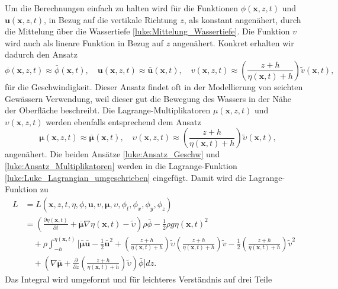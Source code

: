Um die Berechnungen einfach zu halten wird für die Funktionen $\phi (\bm{x},z,t)$ und $\bm{u} (\bm{x},z,t)$, in Bezug auf die vertikale Richtung $z$, als konstant angenähert, durch die Mittelung über die Wassertiefe \eqref{luke:Mittelung_Wassertiefe}.
Die Funktion $v$ wird auch als lineare Funktion in Bezug auf $z$ angenähert. 
Konkret erhalten wir dadurch den Ansatz
\begin{equation}
	\phi(\bm{x},z,t) \approx \bar{\phi}(\bm{x}, t), \quad \bm{u}(\bm{x},z,t) \approx \bar{\bm{u}}(\bm{x}, t), \quad v(\bm{x},z,t) \approx \left(\frac{z + h}{\eta(\bm{x}, t) + h}\right) \tilde{v}(\bm{x}, t),
	\label{luke:Ansatz_Geschw}
\end{equation}
für die Geschwindigkeit.
Dieser Ansatz findet oft in der Modellierung von seichten Gewässern Verwendung, weil dieser gut die Bewegung des Wassers in der Nähe der Oberfläche beschreibt.
Die Lagrange-Multiplikatoren $\mu(\bm{x},z,t)$ und $\upsilon(\bm{x},z,t)$ werden ebenfalls entsprechend dem Ansatz
\begin{equation}
	\quad \bm{\mu}(\bm{x},z,t) \approx \bar{\bm{\mu}}(\bm{x}, t), \quad \upsilon(\bm{x},z,t) \approx \left(\frac{z + h}{\eta(\bm{x}, t) + h}\right)\tilde{\upsilon}(\bm{x}, t),
	\label{luke:Ansatz_Multiplikatoren}
\end{equation}
angenähert.
Die beiden Ansätze \eqref{luke:Ansatz_Geschw} und \eqref{luke:Ansatz_Multiplikatoren} werden in die Lagrange-Funktion \eqref{luke:Luke_Lagrangian_umgeschrieben} eingefügt.
Damit wird die Lagrange-Funktion zu
\begin{align*}
	L&=
	L(\bm{x},z,t,\eta,\phi,\bm{u}, v, \bm{\mu},\upsilon,\phi_t,\phi_x,\phi_y,\phi_z)
	\\
	&=
	\left(\frac{\partial \eta(\bm{x}, t)}{\partial t}
	+
	\bar{\bm{\mu}}  \nabla \eta(\bm{x}, t)
	-
	\widetilde{\upsilon}\right)\rho \bar{\phi}
	-
	\frac{1}{2} \rho g \eta(\bm{x}, t)^2
	\\
	&\quad+
	\rho\int_{-h}^{\eta(\bm{x}, t)} \Bigg[ \bar{\bm{\mu}}  \bar{\bm{u}} - \frac{1}{2} \bar{\bm{u}}^2 +\left(\frac{z + h}{\eta(\bm{x}, t) + h}\right)\tilde{\upsilon} \left(\frac{z + h}{\eta(\bm{x}, t) + h}\right)\tilde{v} - \frac{1}{2} \left(\frac{z + h}{\eta(\bm{x}, t) + h}\right)\tilde{v}^2 
	\\
	&\quad+\left(\nabla \bar{\bm{\mu}} + \frac{\partial}{\partial z} \left(\frac{z + h}{\eta(\bm{x}, t) + h}\right)\tilde{\upsilon}\right) \bar{\phi} \Bigg] dz.
\end{align*}
Das Integral wird umgeformt und für leichteres Verständnis auf drei Teile
